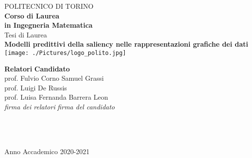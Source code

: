 \begin{titlepage}

\begin{center}

{\huge POLITECNICO DI TORINO}\\[1.5cm]
\textbf{Corso di Laurea\\in Ingegneria Matematica}\\[3cm]

{\Large Tesi di Laurea}\\[1cm]
\textbf{\LARGE Modelli predittivi della saliency nelle rappresentazioni grafiche dei dati }\\[2cm]
\texttt{[image: ./Pictures/logo\_polito.jpg]}
\vspace{3cm}


\begin{minipage}{0.85\textwidth}
\begin{flushleft}\large
\textbf{Relatori} \hfill \textbf{Candidato}\\
prof. Fulvio Corno \hfill  Samuel Grassi \\
prof. Luigi De Russis \\
prof. Luisa Fernanda Barrera Leon \\
\textit{firma dei relatori} \hfill \textit{firma del candidato}\\[0.35cm]
\fillin\ \hfill \\
\fillin\ \hfill \\
\fillin\ \hfill \fillin
\end{flushleft}
\end{minipage}

\vfill

Anno Accademico 2020-2021
\end{center}

\restoregeometry %

\end{titlepage}